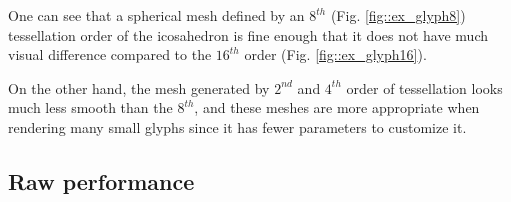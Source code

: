 \documentclass[twoside,twocolumn,10pt]{article}
\begin{document}
One can see that a spherical mesh defined by an $8^{th}$ (Fig. \ref{fig::ex_glyph8}) tessellation order of the icosahedron is fine enough that it does not have much visual difference compared to the $16^{th}$ order (Fig. \ref{fig::ex_glyph16}).

On the other hand, the mesh generated by $2^{nd}$ and $4^{th}$ order of tessellation looks much less smooth than the $8^{th}$, and these meshes are more appropriate when rendering many small glyphs since it has fewer parameters to customize it.






\subsection{Raw performance}

\end{document}
